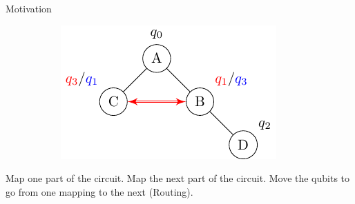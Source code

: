 \documentclass{beamer}
\begin{document}
\begin{frame}{Motivation}
\begin{figure}
\begin{subfigure}[b]{0.45\textwidth}
\begin{overprint}
		\centering
		\includegraphics[scale=0.6]{figures/swapped_mapping}		
		\end{overprint}
     \end{subfigure}
     \hfill %
\end{figure}
\pause
Map one part of the circuit. \pause \pause Map the next part of the circuit. \pause Move the qubits to go from one mapping to the next (Routing).

\end{frame}
\end{document}
